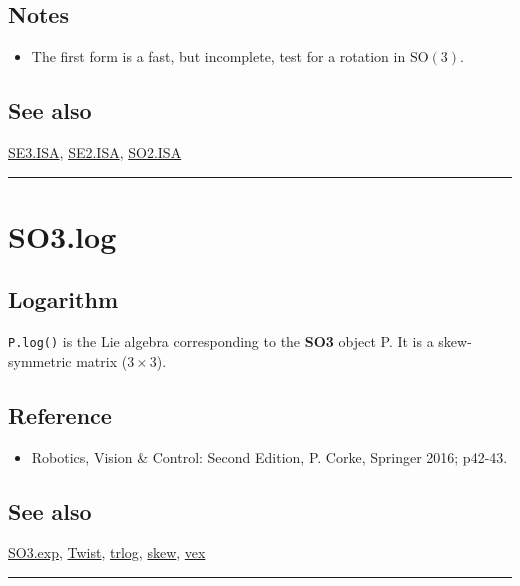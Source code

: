 \subsection*{Notes}
\begin{itemize}
  \item The first form is a fast, but incomplete, test for a rotation in $\mbox{SO}(3)$.
\end{itemize}

\subsection*{See also}


\hyperlink{SE3.ISA}{\color{blue} SE3.ISA}, \hyperlink{SE2.ISA}{\color{blue} SE2.ISA}, \hyperlink{SO2.ISA}{\color{blue} SO2.ISA}

\vspace{1.5ex}\hrule

\hypertarget{SO3.log}{\section*{SO3.log}}
\subsection*{Logarithm}


\texttt{P.log()} is the Lie algebra corresponding to the \textbf{\color{red} SO3} object P. It is
a skew-symmetric matrix ($3 \times 3$).


\subsection*{Reference}
\begin{itemize}
  \item Robotics, Vision \& Control: Second Edition, P. Corke, Springer 2016; p42-43.
\end{itemize}

\subsection*{See also}


\hyperlink{SO3.exp}{\color{blue} SO3.exp}, \hyperlink{Twist}{\color{blue} Twist}, \hyperlink{trlog}{\color{blue} trlog}, \hyperlink{skew}{\color{blue} skew}, \hyperlink{vex}{\color{blue} vex}

\vspace{1.5ex}\hrule

